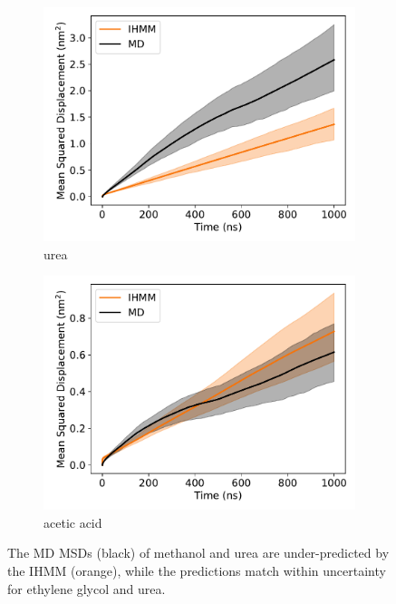 \documentclass[journal=jpcbfk,manuscript=article]{achemso}
\begin{document}
\begin{figure}
\begin{subfigure}{0.45\textwidth}
  \includegraphics[width=\textwidth]{unclustered_msd_URE.pdf}
  \caption{urea}\label{fig:unclustered_msd_URE}
  \end{subfigure}
  \begin{subfigure}{0.45\textwidth}
  \includegraphics[width=\textwidth]{unclustered_msd_ACH.pdf}
  \caption{acetic acid}\label{fig:unclustered_msd_ACH}
  \end{subfigure}
  \caption{The MD MSDs (black) of methanol and urea are under-predicted by 
  the IHMM (orange), while the predictions match within uncertainty for ethylene
  glycol and urea.}\label{fig:unclustered_msds}
  \end{figure}
  
\end{document}
